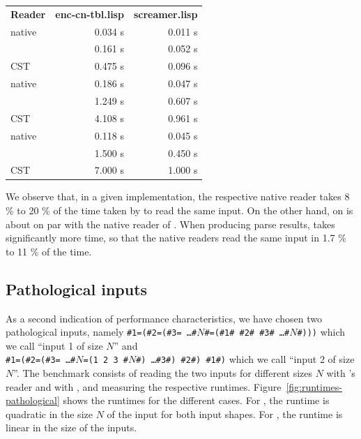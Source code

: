\vspace{1em}\noindent%
\begin{tabular}{lrr}
  \textbf{Reader}         & \textbf{enc-cn-tbl.lisp} & \textbf{screamer.lisp}\\
  \sbcl{} native          & 0.034 s                  & 0.011 s\\
  \sbcl{} \eclector{}     & 0.161 s                  & 0.052 s\\
  \sbcl{} \eclector{} CST & 0.475 s                  & 0.096 s\\
  \ccl{} native           & 0.186 s                  & 0.047 s\\
  \ccl{} \eclector{}      & 1.249 s                  & 0.607 s\\
  \ccl{} \eclector{} CST  & 4.108 s                  & 0.961 s\\
  \ecl{} native           & 0.118 s                  & 0.045 s\\
  \ecl{} \eclector{}      & 1.500 s                  & 0.450 s\\
  \ecl{} \eclector{} CST  & 7.000 s                  & 1.000 s\\
\end{tabular}
\vspace{1em}

\noindent We observe that, in a given \cl{} implementation, the
respective native reader takes 8 \% to 20 \% of the time taken by
\eclector{} to read the same input.  On the other hand, \eclector{} on
\sbcl{} is about on par with the native reader of \ccl{}.  When
producing parse results, \eclector{} takes significantly more time, so
that the native readers read the same input in 1.7 \% to 11 \% of the
time.

\subsection{Pathological inputs}
\label{sec:pathological-inputs}

As a second indication of performance characteristics, we have chosen
two pathological inputs, namely
\texttt{\#1=(\#2=(\#3= \dots \#$N$\#=(\#1\# \#2\# \#3\# \dots \#$N$\#)))}
which we call ``input 1 of size $N$'' and\\
\texttt{\#1=(\#2=(\#3= \dots \#$N$=(1 2 3 \#$N$\#) \dots \#3\#) \#2\#) \#1\#)}
which we call ``input 2 of size $N$''.  The benchmark consists of
reading the two inputs for different sizes $N$ with \sbcl{}'s reader
and with \eclector{}, and measuring the respective runtimes.
Figure~\ref{fig:runtimes-pathological} shows the runtimes for the
different cases.  For \sbcl{}, the runtime is quadratic in the size
$N$ of the input for both input shapes.  For \eclector{}, the runtime
is linear in the size of the inputs.

